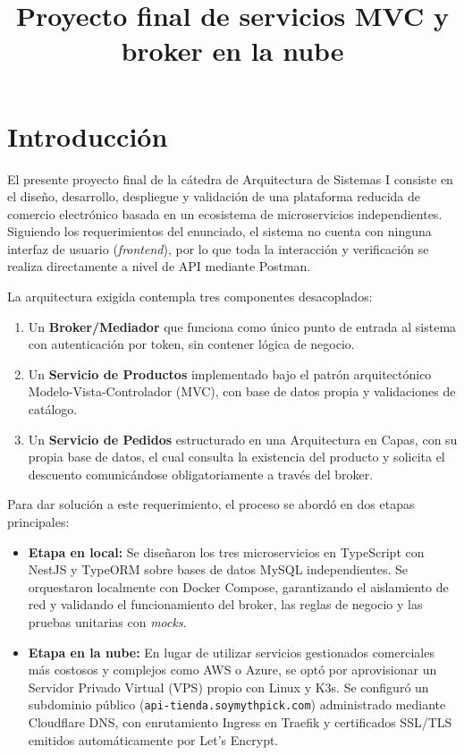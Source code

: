 \documentclass[conference]{IEEEtran}
\begin{document}
\title{Proyecto final de servicios MVC y broker en la nube}

\author{
}

\maketitle

\section{Introducción}
El presente proyecto final de la cátedra de Arquitectura de Sistemas I consiste en el diseño, desarrollo, despliegue y validación de una plataforma reducida de comercio electrónico basada en un ecosistema de microservicios independientes. Siguiendo los requerimientos del enunciado, el sistema no cuenta con ninguna interfaz de usuario (\textit{frontend}), por lo que toda la interacción y verificación se realiza directamente a nivel de API mediante Postman.

La arquitectura exigida contempla tres componentes desacoplados:
\begin{enumerate}
    \item Un \textbf{Broker/Mediador} que funciona como único punto de entrada al sistema con autenticación por token, sin contener lógica de negocio.
    \item Un \textbf{Servicio de Productos} implementado bajo el patrón arquitectónico Modelo-Vista-Controlador (MVC), con base de datos propia y validaciones de catálogo.
    \item Un \textbf{Servicio de Pedidos} estructurado en una Arquitectura en Capas, con su propia base de datos, el cual consulta la existencia del producto y solicita el descuento comunicándose obligatoriamente a través del broker.
\end{enumerate}

Para dar solución a este requerimiento, el proceso se abordó en dos etapas principales:
\begin{itemize}
    \item \textbf{Etapa en local:} Se diseñaron los tres microservicios en TypeScript con NestJS y TypeORM sobre bases de datos MySQL independientes. Se orquestaron localmente con Docker Compose, garantizando el aislamiento de red y validando el funcionamiento del broker, las reglas de negocio y las pruebas unitarias con \textit{mocks}.
    \item \textbf{Etapa en la nube:} En lugar de utilizar servicios gestionados comerciales más costosos y complejos como AWS o Azure, se optó por aprovisionar un Servidor Privado Virtual (VPS) propio con Linux y K3s. Se configuró un subdominio público (\texttt{api-tienda.soymythpick.com}) administrado mediante Cloudflare DNS, con enrutamiento Ingress en Traefik y certificados SSL/TLS emitidos automáticamente por Let's Encrypt.
\end{itemize}
\end{document}
